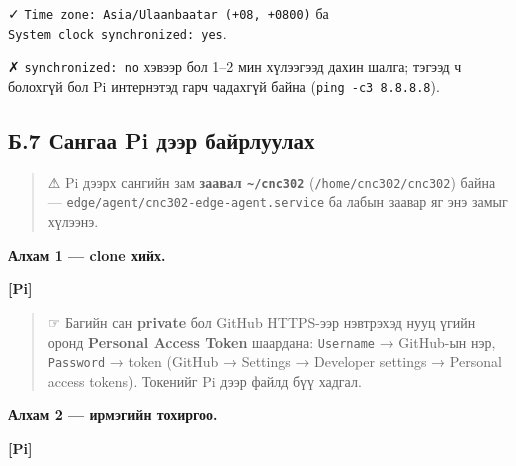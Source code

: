 ✓ \texttt{Time\ zone:\allowbreak{}\ Asia/\allowbreak{}Ulaanbaatar\ (+08,\ +0800)} ба \texttt{System\ clock\ synchronized:\allowbreak{}\ yes}.

✗ \texttt{synchronized:\allowbreak{}\ no} хэвээр бол 1--2 мин хүлээгээд дахин шалга; тэгээд ч болохгүй бол Pi интернэтэд гарч чадахгүй байна (\texttt{ping\ -c3\ 8.\allowbreak{}8.\allowbreak{}8.\allowbreak{}8}).

\hypertarget{ux431.7-ux441ux430ux43dux433ux430ux430-pi-ux434ux44dux44dux440-ux431ux430ux439ux440ux43bux443ux443ux43bux430ux445}{%
\subsection{Б.7 Сангаа Pi дээр байрлуулах}\label{ux431.7-ux441ux430ux43dux433ux430ux430-pi-ux434ux44dux44dux440-ux431ux430ux439ux440ux43bux443ux443ux43bux430ux445}}

\begin{quote}
⚠ Pi дээрх сангийн зам \textbf{заавал \texttt{\textasciitilde{}/cnc302}} (\texttt{/\allowbreak{}home/\allowbreak{}cnc302/\allowbreak{}cnc302}) байна --- \texttt{edge/\allowbreak{}agent/\allowbreak{}cnc302-edge-agent.\allowbreak{}service} ба лабын заавар яг энэ замыг хүлээнэ.
\end{quote}

\textbf{Алхам 1 --- clone хийх.}

\textbf{{[}Pi{]}}

\begin{Shaded}
\begin{Highlighting}[]
\NormalTok{ \textasciitilde{}}
\OperatorTok{\textless{}}\OperatorTok{\textgreater{}}
\end{Highlighting}
\end{Shaded}

\begin{quote}
☞ Багийн сан \textbf{private} бол GitHub HTTPS-ээр нэвтрэхэд нууц үгийн оронд \textbf{Personal Access Token} шаардана: \texttt{Username} → GitHub-ын нэр, \texttt{Password} → token (GitHub → Settings → Developer settings → Personal access tokens). Токенийг Pi дээр файлд бүү хадгал.
\end{quote}

\textbf{Алхам 2 --- ирмэгийн тохиргоо.}

\textbf{{[}Pi{]}}

\begin{Shaded}
\begin{Highlighting}[]
\end{Highlighting}
\end{Shaded}

